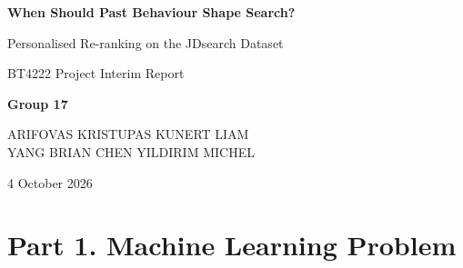 \documentclass[11pt,a4paper]{article}
\begin{document}
\begin{center}
{\LARGE\bfseries When Should Past Behaviour Shape Search?\par}
\vspace{6pt}
{\large Personalised Re-ranking on the JDsearch Dataset\par}
\vspace{10pt}
{BT4222 Project Interim Report\par}
\vspace{10pt}
{\bfseries Group 17\par}
\vspace{4pt}
ARIFOVAS KRISTUPAS \quad KUNERT LIAM\\
YANG BRIAN CHEN \quad YILDIRIM MICHEL\par
\vspace{6pt}
4 October 2026
\end{center}
\vspace{4pt}

\section{Part 1. Machine Learning Problem}
\end{document}
